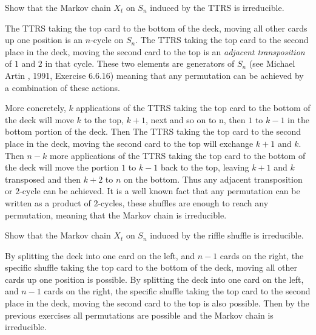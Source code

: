\documentclass[12pt]{article}
\begin{document}
\begin{exercise}
    Show that the Markov chain \( X_t \) on \( S_n \) induced by the
    TTRS is irreducible.
\end{exercise}
\begin{solution}
    The TTRS taking the top card to the bottom of the deck, moving all
    other cards up one position is an \( n \)-cycle on \( S_n \). The
    TTRS taking the top card to the second place in the deck, moving the
    second card to the top is an \emph{adjacent transposition} of \( 1 \)
    and \( 2 \) in that cycle.  These two elements are generators of \(
    S_n \) (see Michael Artin , 1991, Exercise 6.6.16)
    meaning that any permutation can be achieved by a combination of
    these actions.

    More concretely, \( k \) applications of the TTRS taking the top
    card to the bottom of the deck will move \( k \) to the top, \( k+1 \),
    next and so on to n, then \( 1 \) to \( k-1 \) in the bottom portion
    of the deck.  Then The TTRS taking the top card to the second place
    in the deck, moving the second card to the top will exchange \( k+1 \)
    and \( k \).  Then \( n-k \) more applications of the TTRS taking
    the top card to the bottom of the deck will move the portion \( 1 \)
    to \( k-1 \) back to the top, leaving \( k+1 \) and \( k \)
    transposed and then \( k+2 \) to \( n \) on the bottom.  Thus any
    adjacent transposition or \( 2 \)-cycle can be achieved.  It is a
    well known fact that any permutation can be written as a product of \(
    2 \)-cycles, these shuffles are enough to reach any permutation,
    meaning that the Markov chain is irreducible.
  \end{solution}

  
\begin{exercise}
    Show that the Markov chain \( X_t \) on \( S_n \) induced by the
    riffle shuffle is irreducible.
  \end{exercise}
\begin{solution}
    By splitting the deck into one card on the left, and \( n-1 \) cards
    on the right, the specific shuffle taking the top card to the bottom
    of the deck, moving all other cards up one position is possible.  By
    splitting the deck into one card on the left, and \( n-1 \) cards on
    the right, the specific shuffle taking the top card to the second
    place in the deck, moving the second card to the top is also
    possible. Then by the previous exercises all permutations are
    possible and the Markov chain is irreducible.
  \end{solution}
  
\end{document}
